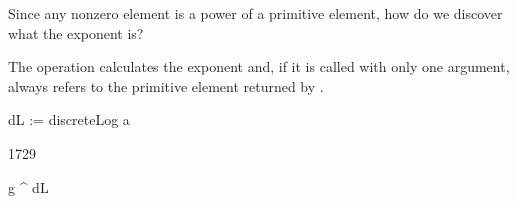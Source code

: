 {{{{{{{{{{{{{{{{{Since any nonzero element is a power of a primitive element, how
do we discover what the exponent is?
%
\begin{xtc}
\begin{xtccomment}
The operation  calculates
the exponent and,
if it is called with only one argument, always refers to the primitive
element returned by .
\end{xtccomment}
\begin{spadsrc}
dL := discreteLog a 
\end{spadsrc}
\begin{TeXOutput}
\begin{fricasmath}{8}
1729%
\end{fricasmath}
\end{TeXOutput}
\end{xtc}
\begin{xtc}
\begin{xtccomment}
\end{xtccomment}
\begin{spadsrc}
g ^ dL 
\end{spadsrc}
\begin{TeXOutput}
\begin{fricasmath}{9}
%
\end{fricasmath}
\end{TeXOutput}
\end{xtc}

}}}}}}}}}}}}}}}}}
